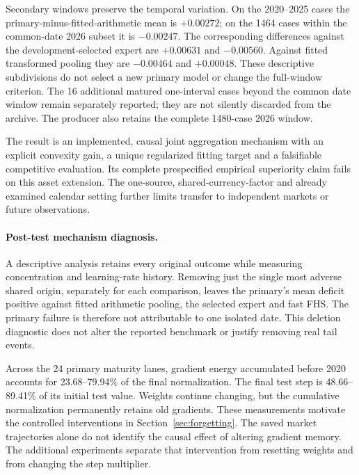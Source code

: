 \documentclass[11pt,a4paper]{article}
\theoremstyle{definition}\newtheorem{definition}[theorem]{Definition}
\begin{document}
Secondary windows preserve the temporal variation. On the 2020--2025 cases the primary-minus-fitted-arithmetic mean is $+0.00272$; on the 1464 cases within the common-date 2026 subset it is $-0.00247$. The corresponding differences against the development-selected expert are $+0.00631$ and $-0.00560$. Against fitted transformed pooling they are $-0.00464$ and $+0.00048$. These descriptive subdivisions do not select a new primary model or change the full-window criterion. The 16 additional matured one-interval cases beyond the common date window remain separately reported; they are not silently discarded from the archive. The producer also retains the complete 1480-case 2026 window.

The result is an implemented, causal joint aggregation mechanism with an explicit convexity gain, a unique regularized fitting target and a falsifiable competitive evaluation. Its complete prespecified empirical superiority claim fails on this asset extension. The one-source, shared-currency-factor and already examined calendar setting further limits transfer to independent markets or future observations.



\paragraph{Post-test mechanism diagnosis.}
A descriptive analysis retains every original outcome while measuring concentration and learning-rate history. Removing just the single most adverse shared origin, separately for each comparison, leaves the primary's mean deficit positive against fitted arithmetic pooling, the selected expert and fast FHS. The primary failure is therefore not attributable to one isolated date. This deletion diagnostic does not alter the reported benchmark or justify removing real tail events.

Across the 24 primary maturity lanes, gradient energy accumulated before 2020 accounts for 23.68--79.94\% of the final normalization. The final test step is 48.66--89.41\% of its initial test value. Weights continue changing, but the cumulative normalization permanently retains old gradients. These measurements motivate the controlled interventions in Section~\ref{sec:forgetting}. The saved market trajectories alone do not identify the causal effect of altering gradient memory. The additional experiments separate that intervention from resetting weights and from changing the step multiplier.
\end{document}
